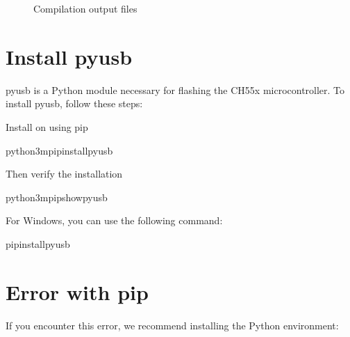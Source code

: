 \documentclass[letterpaper,10pt,english]{sphinxmanual}
\begin{document}
\begin{figure}[htbp]
\centering
\capstart

\noindent{}
\caption{Compilation output files}\label{\detokenize{compile:id18}}\label{\detokenize{compile:files}}\end{figure}


\section{Install pyusb}
\label{\detokenize{compile:install-pyusb}}
\sphinxAtStartPar
pyusb is a Python module necessary for flashing the CH55x microcontroller. To install pyusb, follow these steps:

\sphinxAtStartPar
Install  on using pip

\begin{sphinxVerbatim}[commandchars=\\\{\}]
python3\PYGZhy{}mpipinstallpyusb
\end{sphinxVerbatim}

\sphinxAtStartPar
Then verify the installation

\begin{sphinxVerbatim}[commandchars=\\\{\}]
python3\PYGZhy{}mpipshowpyusb
\end{sphinxVerbatim}

\sphinxAtStartPar
For Windows, you can use the following command:

\begin{sphinxVerbatim}[commandchars=\\\{\}]
pipinstallpyusb
\end{sphinxVerbatim}


\section{Error with pip}
\label{\detokenize{compile:error-with-pip}}
\sphinxAtStartPar
If you encounter this error, we recommend installing the Python environment:

\begin{sphinxVerbatim}[commandchars=\\\{\}]
   
\end{sphinxVerbatim}
\end{document}

